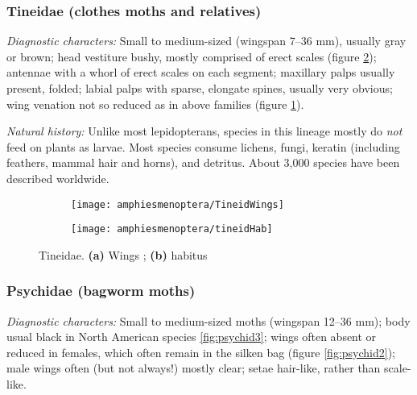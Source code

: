 \subsubsection{Tineidae (clothes moths and relatives)}
\noindent{}\textit{Diagnostic characters:} Small to medium-sized (wingspan 7--36 mm), usually gray or brown; head vestiture bushy, mostly comprised of erect scales (figure \ref{fig:tineid2}); antennae with a whorl of erect scales on each segment; maxillary palps usually present, folded; labial palps with sparse, elongate spines, usually very obvious; wing venation not so reduced as in above families (figure \ref{fig:tineid1}).\vspace{3mm}

\noindent{}\textit{Natural history:} Unlike most lepidopterans, species in this lineage mostly do \textit{not} feed on plants as larvae. Most species consume lichens, fungi, keratin (including feathers, mammal hair and horns), and detritus. About 3,000 species have been described worldwide.

\begin{figure}[ht!]
    \centering
    \begin{subfigure}[ht!]{0.45\textwidth}
        \texttt{[image: amphiesmenoptera/TineidWings]}
        \caption{}
        \label{fig:tineid1}
    \end{subfigure}
    \hfill
    \begin{subfigure}[ht!]{0.50\textwidth}
        \texttt{[image: amphiesmenoptera/tineidHab]}
        \caption{}
        \label{fig:tineid2}
    \end{subfigure}
    \caption{Tineidae. \textbf{(a)} Wings \citep[][Fig. 6]{DavisTineid1998}; \textbf{(b)} habitus \cite[][Fig. 17]{bhlitem20176riley}}\label{fig:tineids}
\end{figure}

\subsubsection{Psychidae (bagworm moths)}
\noindent{}\textit{Diagnostic characters:} Small to medium-sized moths (wingspan 12--36 mm); body usual black in North American species \ref{fig:psychid3}; wings often absent or reduced in females, which often remain in the silken bag (figure \ref{fig:psychid2}); male wings often (but not always!) mostly clear; setae hair-like, rather than scale-like.\vspace{3mm}

